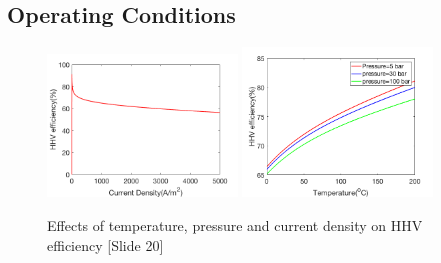     
  \subsection{Operating Conditions}
\begin{figure}[H]
\centering
\includegraphics[width=0.45\textwidth]{pres1.png}
\includegraphics[width=0.45\textwidth]{pres2.png}
\caption{Effects of temperature, pressure and current density on HHV efficiency [Slide 20]} 
\end{figure} 

